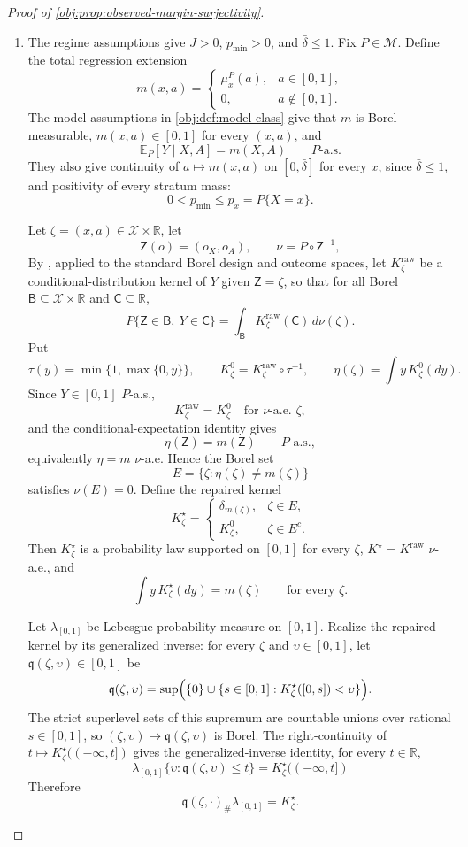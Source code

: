 \begin{proof}[Proof of \cref{obj:prop:observed-margin-surjectivity}]
\begin{enumerate}
\item The regime assumptions give \(J>0\), \(p_{\min}>0\), and \(\bar\delta\le 1\).  Fix \(P\in\mathcal M\).  Define the total regression extension
\[
m(x,a)=
\begin{cases}
\mu_x^P(a), & a\in[0,1],\\
0, & a\notin[0,1].
\end{cases}
\]
The model assumptions in \cref{obj:def:model-class} give that \(m\) is Borel measurable, \(m(x,a)\in[0,1]\) for every \((x,a)\), and
\[
\mathbb E_P[Y\mid X,A]=m(X,A)\qquad P\text{-a.s.}
\]
They also give continuity of \(a\mapsto m(x,a)\) on \([0,\bar\delta]\) for every \(x\), since \(\bar\delta\le1\), and positivity of every stratum mass:
\[
0<p_{\min}\le p_x=P\{X=x\}.
\]

Let \(\zeta=(x,a)\in\mathcal X\times\mathbb R\), let
\[
\mathsf Z(o)=(o_X,o_A),
\qquad
\nu=P\circ\mathsf Z^{-1},
\]
By \citet[Theorem 6.3]{Kallenberg2002Foundations}, applied to the standard Borel design and outcome spaces, let \(K^{\mathrm{raw}}_\zeta\) be a conditional-distribution kernel of \(Y\) given \(\mathsf Z=\zeta\), so that for all Borel \(\mathsf B\subseteq\mathcal X\times\mathbb R\) and \(\mathsf C\subseteq\mathbb R\),
\[
P\{\mathsf Z\in\mathsf B,\ Y\in\mathsf C\}
=
\int_{\mathsf B}K^{\mathrm{raw}}_\zeta(\mathsf C)\,d\nu(\zeta).
\]
Put
\[
\tau(y)=\min\{1,\max\{0,y\}\},
\qquad
K^0_\zeta=K^{\mathrm{raw}}_\zeta\circ\tau^{-1},
\qquad
\eta(\zeta)=\int y\,K^0_\zeta(dy).
\]
Since \(Y\in[0,1]\) \(P\)-a.s.,
\[
K^{\mathrm{raw}}_\zeta=K^0_\zeta
\quad\text{for }\nu\text{-a.e. }\zeta,
\]
and the conditional-expectation identity gives
\[
\eta(\mathsf Z)=m(\mathsf Z)\qquad P\text{-a.s.},
\]
equivalently \(\eta=m\) \(\nu\)-a.e.  Hence the Borel set
\[
E=\{\zeta:\eta(\zeta)\ne m(\zeta)\}
\]
satisfies \(\nu(E)=0\).  Define the repaired kernel
\[
K^\star_\zeta=
\begin{cases}
\delta_{m(\zeta)}, & \zeta\in E,\\
K^0_\zeta, & \zeta\in E^c.
\end{cases}
\]
Then \(K^\star_\zeta\) is a probability law supported on \([0,1]\) for every \(\zeta\), \(K^\star=K^{\mathrm{raw}}\) \(\nu\)-a.e., and
\[
\int y\,K^\star_\zeta(dy)=m(\zeta)\qquad\text{for every }\zeta.
\]

Let \(\lambda_{[0,1]}\) be Lebesgue probability measure on \([0,1]\).  Realize the repaired kernel by its generalized inverse: for every \(\zeta\) and \(\upsilon\in[0,1]\), let \(\mathfrak q(\zeta,\upsilon)\in[0,1]\) be
\[
\mathfrak q(\zeta,\upsilon)
=
\sup\Bigl(\{0\}\cup
\{s\in[0,1]:K^\star_\zeta([0,s])<\upsilon\}\Bigr).
\]  The strict superlevel sets of this supremum are countable unions over rational \(s\in[0,1]\), so \((\zeta,\upsilon)\mapsto\mathfrak q(\zeta,\upsilon)\) is Borel.  The right-continuity of \(t\mapsto K^\star_\zeta((-\infty,t])\) gives the generalized-inverse identity, for every \(t\in\mathbb R\),
\[
\lambda_{[0,1]}\{\upsilon:\mathfrak q(\zeta,\upsilon)\le t\}
=
K^\star_\zeta((-\infty,t])
\]
Therefore
\[
\mathfrak q(\zeta,\cdot)_\#\lambda_{[0,1]}=K^\star_\zeta.
\]


\end{enumerate}
\end{proof}
